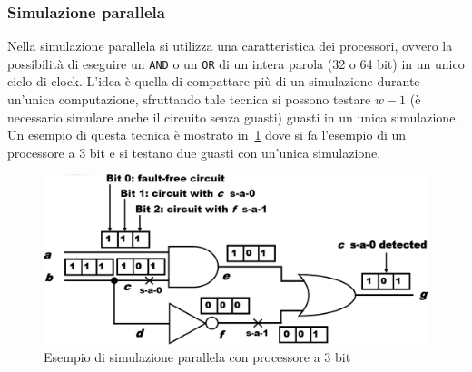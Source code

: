 \subsubsection{Simulazione parallela}
Nella simulazione parallela si utilizza una caratteristica dei processori, ovvero la possibilità di eseguire un \texttt{AND} o un \texttt{OR} di un intera parola (32 o 64 bit) in un unico ciclo di clock. L'idea è quella di compattare più di un simulazione durante un'unica computazione, sfruttando tale tecnica si possono testare $w-1$ (è necessario simulare anche il circuito senza guasti) guasti in un unica simulazione. Un esempio di questa tecnica è mostrato in \figurename\,\ref{fig:simparallel} dove si fa l'esempio di un processore a 3 bit e si testano due guasti con un'unica simulazione.
\begin{figure}
\centering
\includegraphics[scale=0.4]{img/simparallel.png}
\caption{Esempio di simulazione parallela con processore a 3 bit}\label{fig:simparallel}
\end{figure}
